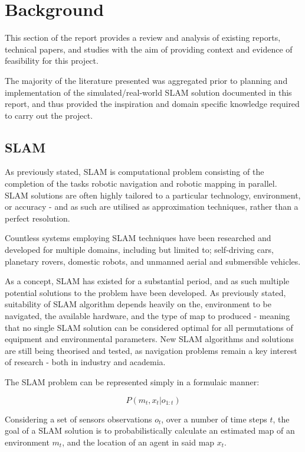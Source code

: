 \section{Background} \label{sec_background}
This section of the report provides a review and analysis of existing reports,
technical papers, and studies with the aim of providing context and evidence
of feasibility for this project.

The majority of the literature presented was aggregated prior to planning and
implementation of the simulated/real-world SLAM solution documented in this
report, and thus provided the inspiration and domain specific knowledge
required to carry out the project.


\subsection{SLAM}
As previously stated, SLAM is computational problem consisting of the
completion of the tasks robotic navigation and robotic mapping in parallel.
SLAM solutions are often highly tailored to a particular technology,
environment, or accuracy - and as such are utilised as approximation
techniques, rather than a perfect resolution.

Countless systems employing SLAM techniques have been researched and developed
for multiple domains, including but limited to; self-driving cars, planetary
rovers, domestic robots, and unmanned aerial and submersible vehicles.

As a concept, SLAM has existed for a substantial period, and as such multiple
potential solutions to the problem have been developed.
As previously stated, suitability of SLAM algorithm depends heavily on the,
environment to be navigated, the available hardware, and the type of map to
produced - meaning that no single SLAM solution can be considered optimal for
all permutations of equipment and environmental parameters.
New SLAM algorithms and solutions are still being theorised and tested, as
navigation problems remain a key interest of research - both in industry and
academia.

The SLAM problem can be represented simply in a formulaic manner:

\[ P(m_t,x_t|o_{1:t}) \]

Considering a set of sensors observations \(o_t \), over a number of time
steps \(t\), the goal of a SLAM solution is to probabilistically calculate an
estimated map of an environment \(m_t\), and the location of an agent in said
map \(x_t\).

